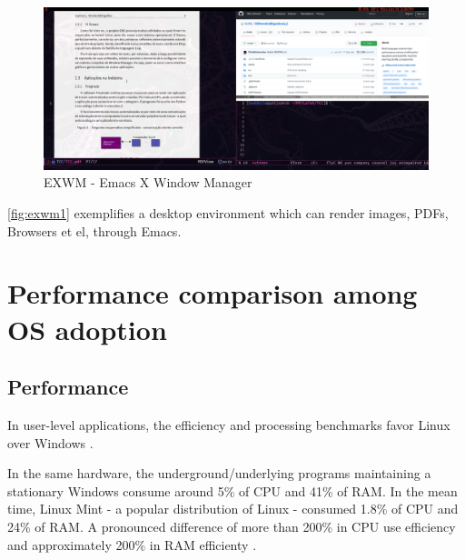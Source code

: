 \documentclass[
12pt,				%
openright,			%
oneside,			%
a4paper,			%
brazil,				%
english,			%
]{abntex2}
\begin{document}
\begin{figure}[ht]
  \centering
  \caption{\label{fig:exwm1} EXWM - Emacs X Window Manager}
  \includegraphics[width=\linewidth]{exwm2.png}
\end{figure}

\autoref{fig:exwm1} exemplifies a desktop environment which can render
images, PDFs, Browsers et el, through Emacs. 




\section{Performance comparison among OS adoption}

\subsection{Performance}
In user-level applications, the efficiency and processing benchmarks
favor Linux over Windows \cite{sulaiman2021comparison}.

In the same hardware, the underground/underlying programs maintaining
a stationary Windows consume around 5\% of CPU and 41\% of RAM. In the
mean time, Linux Mint - a popular distribution of Linux - consumed
1.8\% of CPU and 24\% of RAM. A pronounced difference of more than
200\% in CPU use efficiency and approximately 200\% in RAM efficienty \cite{sulaiman2021comparison}. 
\end{document}
